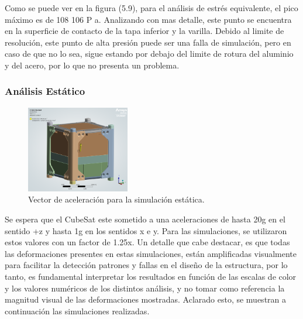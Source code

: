       Como se puede ver en la figura (5.9), para el análisis de estrés equivalente, el pico máximo
      es de 108  106 P a. Analizando con mas detalle, este punto se encuentra en la superficie de
      contacto de la tapa inferior y la varilla. Debido al limite de resolución, este punto de alta
      presión puede ser una falla de simulación, pero en caso de que no lo sea, sigue estando por
      debajo del limite de rotura del aluminio y del acero, por lo que no presenta un problema.

    \subsubsection{Análisis Estático}
      \begin{minipage}{\textwidth}
        \begin{figure}
          \centering
          \includegraphics[width=0.4\textwidth]{image/fem/ansys_cubesat-static_acceleration.png}
          \caption{Vector de aceleración para la simulación estática.}
          \label{fig:fem_static_acc}
        \end{figure}
        \hspace*{2em}
        Se espera que el CubeSat este sometido a una aceleraciones de hasta 20g en el sentido +z y hasta 1g en
        los sentidos x e y. Para las simulaciones, se utilizaron
        estos valores con un factor de 1.25x. Un detalle que cabe destacar, es que todas las deformaciones presentes
        en estas simulaciones, están amplificadas visualmente para facilitar la detección patrones y fallas en el
        diseño de la estructura, por lo tanto, es fundamental
        interpretar los resultados en función de las escalas de
        color y los valores numéricos de los distintos análisis,
        y no tomar como referencia la magnitud visual de las
        deformaciones mostradas. Aclarado esto, se muestran
        a continuación las simulaciones realizadas.
      \end{minipage}

